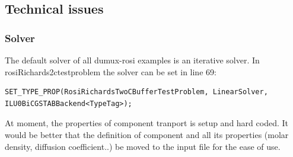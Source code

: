 \subsection*{Technical issues}

\subsubsection*{Solver}

The default solver of all dumux-rosi examples is an iterative solver.
In rosiRichards2ctestproblem the solver can be set in line 69:
\begin{lstlisting}
SET_TYPE_PROP(RosiRichardsTwoCBufferTestProblem, LinearSolver, ILU0BiCGSTABBackend<TypeTag>);
\end{lstlisting}

At moment, the properties of component tranport is setup and hard
coded. It would be better that the definition of component and all
its properties (molar density, diffusion coefficient..) be moved to
the input file for the ease of use.

